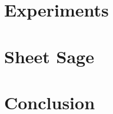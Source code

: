 \documentclass{article}
\begin{document}
\section{Experiments}
\label{sec:experiments}



\section{Sheet Sage}

\section{Conclusion}



\end{document}
